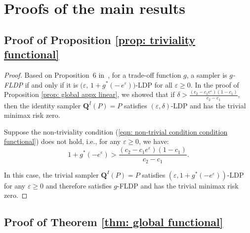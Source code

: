 \documentclass[accepted]{article}
\theoremstyle{plain} %
\theoremstyle{definition}
\theoremstyle{remark}
\newcommand{\eps}{\varepsilon}
\newcommand{\bQ}{\mathbf{Q}}
\newcommand{\N}{\mathbb{N}}
\newcommand{\HG}[1]{\textcolor{cyan}{[#1]}}
\begin{document}
\section{Proofs of the main results
}\label{sec: proofs main}

\subsection{Proof of Proposition \ref{prop: triviality functional}}\label{appendix: proof of triviality functional}
\begin{proof}
    Based on Proposition~6 in~\citet{dong2022gaussian}, for a  trade-off function $g$, a sampler is \emph{$g$-FLDP} if and only if it is $\bigl(\varepsilon,\,1 + g^*(-\,e^\varepsilon)\bigr)$-LDP for all $\varepsilon \ge 0$. In the proof of Proposition \ref{prop: global appx linear}, we showed that if $\delta > \frac{(c_2-c_1e^\eps)(1-c_1)}{c_2-c_1}$, then the identity sampler $\bQ^I(P) = P$ satisfies $(\eps,\delta)$-LDP and has the trivial minimax risk zero.

Suppose the non-triviality condition (\ref{eqn: non-trivial condition condition functional}) does not hold, i.e., for any $\eps \geq 0$, we have:
\[1 + g^*(-e^\eps) > \frac{(c_2-c_1e^\eps)(1-c_1)}{c_2-c_1}.\]

In this case, the trivial sampler $\bQ^I(P) = P$ satisfies $(\eps,1 + g^*(-e^\eps))$-LDP for any $\eps \geq 0$ and therefore satisfies $g$-FLDP and has the trivial minimax risk zero. 
\end{proof}


\subsection{Proof of Theorem \ref{thm: global functional}}\label{proof: theorem global functional}
\end{document}
